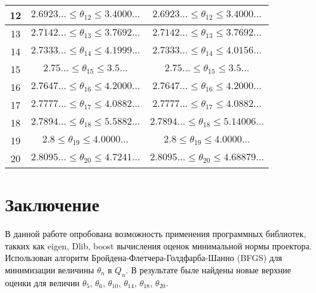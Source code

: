 \documentclass[12pt, a4paper]{extarticle}
\begin{document}
\begin{center}
\begin{tabular}{|c|c|c|}
		12 & $2.6923\ldots\leqslant\theta_{12}\leqslant3.4000\dots$& $2.6923\ldots\leqslant\theta_{12}\leqslant3.4000\dots$ \\ \hline
		13 & $2.7142\ldots\leqslant\theta_{13}\leqslant3.7692\dots$ &$2.7142\ldots\leqslant\theta_{13}\leqslant3.7692\dots$ \\ \hline
		14 &$2.7333\ldots\leqslant\theta_{14}\leqslant4.1999\dots$ & $2.7333\ldots\leqslant\theta_{14}\leqslant4.0156\dots$\\ \hline
		15 & $2.75\ldots\leqslant\theta_{15}\leqslant3.5\dots$&  $2.75\ldots\leqslant\theta_{15}\leqslant3.5\dots$\\ \hline
		16 & $2.7647\ldots\leqslant\theta_{16}\leqslant4.2000\dots$ & $2.7647\ldots\leqslant\theta_{16}\leqslant4.2000\dots$\\ \hline
		17 &$2.7777\ldots\leqslant\theta_{17}\leqslant4.0882\dots$ &$2.7777\ldots\leqslant\theta_{17}\leqslant4.0882\dots$ \\ \hline
		18 & $2.7894\ldots\leqslant\theta_{18}\leqslant5.5882\dots$& $2.7894\ldots\leqslant\theta_{18}\leqslant5.14006\dots$\\ \hline
		19 &$2.8\leqslant\theta_{19}\leqslant4.0000\dots$ & $2.8\leqslant\theta_{19}\leqslant4.0000\dots$\\ \hline
		20 &$2.8095\ldots\leqslant\theta_{20}\leqslant4.7241\dots$ &$2.8095\ldots\leqslant\theta_{20}\leqslant4.68879\dots$ \\ \hline
	\end{tabular}
\end{center}

\newpage
\section{Заключение} 
В данной работе опробована возможность применения программных библиотек, такких как eigen, Dlib, boost вычисления оценок минимальной нормы проектора. Использован алгоритм Бройдена-Флетчера-Голдфарба-Шанно (BFGS) для минимизации величины $\theta_n$ в $Q_n$. В результате быле найдены новые верхние оценки для величин  $\theta_5$, $\theta_6$,  $\theta_{10}$, $\theta_{14}$, $\theta_{18}$, $\theta_{20}$.  
\end{document}

